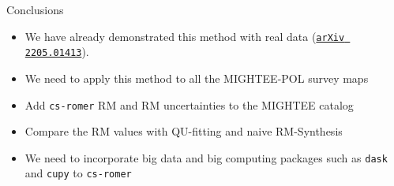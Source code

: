 \documentclass[xetex,aspectratio=169]{beamer}
\begin{document}
    \begin{frame}{Conclusions}
    \begin{itemize}
        \item We have already demonstrated this method with real data \parencite{a1314-csromer} (\href{https://arxiv.org/abs/2205.01413}{\texttt{arXiv 2205.01413}}).
        \item We need to apply this method to all the MIGHTEE-POL survey maps
        \item Add {\tt cs-romer} RM and RM uncertainties to the MIGHTEE catalog
        \item Compare the RM values with QU-fitting and naive RM-Synthesis
        \item We need to incorporate big data and big computing packages such as {\tt dask} and {\tt cupy} to {\tt cs-romer}
    \end{itemize}
    \end{frame}
        
\end{document}
